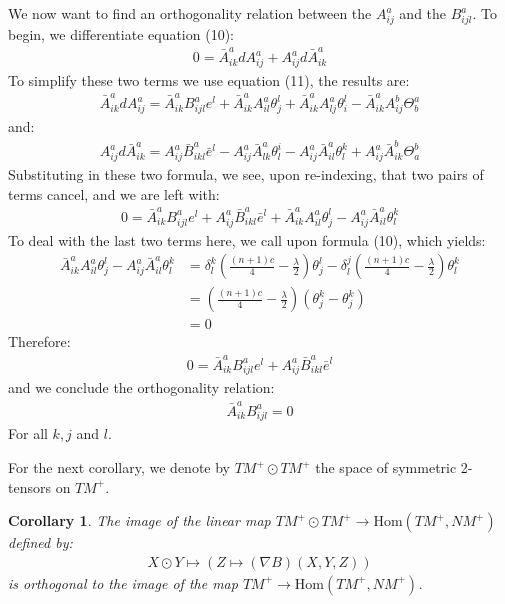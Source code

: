 \documentclass[11pt]{amsart}
\newtheorem{cor}[subsection]{Corollary}
\theoremstyle{definition}
\def \Hom{ \text{Hom} }
\def \TMp{ TM^{+} }
\def \NMp{ NM^+ }
\begin{document}
We now want to find an orthogonality relation between the $A^a_{ij}$ and the $B^a_{ijl}$.  To begin, we differentiate equation (10):
%
\begin{align*}
0 = \bar{A}^a_{ik} d A^a_{ij} + A^a_{ij} d \bar{A}^a_{ik}
\end{align*}
%
To simplify these two terms we use equation (11), the results are:
%
\begin{align*}
\bar{A}^a_{ik} d A^a_{ij} = \bar{A}^a_{ik} B^a_{ijl} e^l + \bar{A}^a_{ik} A^a_{il} \theta^l_j + \bar{A}^a_{ik} A^a_{lj} \theta^l_i - \bar{A}^a_{ik} A^b_{ij} \Theta^a_b
\end{align*}
%
and:
%
\begin{align*}
A^a_{ij} d \bar{A}^a_{ik} = A^a_{ij} \bar{B}^a_{ikl} \bar{e}^l - A^a_{ij} \bar{A}^a_{lk} \theta^i_l - A^a_{ij} \bar{A}^a_{il} \theta^k_l + A^a_{ij} \bar{A}^b_{ik} \Theta^b_a
\end{align*}
%
Substituting in these two formula, we see, upon re-indexing, that two pairs of terms cancel, and we are left with:
%
\begin{align*}
0 = \bar{A}^a_{ik} B^a_{ijl} e^l + A^a_{ij} \bar{B}^a_{ikl} \bar{e}^l + \bar{A}^a_{ik} A^a_{il} \theta^l_j - A^a_{ij} \bar{A}^a_{il} \theta^k_l
\end{align*}
%
To deal with the last two terms here, we call upon formula (10), which yields:
%
\begin{align*}
\bar{A}^a_{ik} A^a_{il} \theta^l_j - A^a_{ij} \bar{A}^a_{il} \theta^k_l &= \delta^k_l \left( \frac{(n+1)c}{4} - \frac{\lambda}{2} \right) \theta^l_j - \delta^j_l \left( \frac{(n+1)c}{4} - \frac{\lambda}{2} \right) \theta^k_l \\
&= \left( \frac{(n+1)c}{4} - \frac{\lambda}{2} \right) \left( \theta^k_j - \theta^k_j \right) \\
&= 0
\end{align*}
%
Therefore:
%
\begin{align*}
0 = \bar{A}^a_{ik} B^a_{ijl} e^l + A^a_{ij} \bar{B}^a_{ikl} \bar{e}^l
\end{align*}
%
and we conclude the orthogonality relation:
%
\begin{align}
\bar{A}^a_{ik} B^a_{ijl} = 0
\end{align}
%
For all $k,j$ and $l$.

For the next corollary, we denote by $\TMp \odot \TMp$ the space of symmetric 2-tensors on $\TMp$.  

\begin{cor} The image of the linear map $\TMp \odot \TMp \rightarrow \Hom( \TMp, \NMp )$ defined by:
%
\begin{align*}
X \odot Y \mapsto ( Z \mapsto( \nabla B )( X, Y, Z ) )
\end{align*}
%
is orthogonal to the image of the map $\TMp \rightarrow \Hom( \TMp, \NMp )$. 
%
\end{cor}
\end{document}
